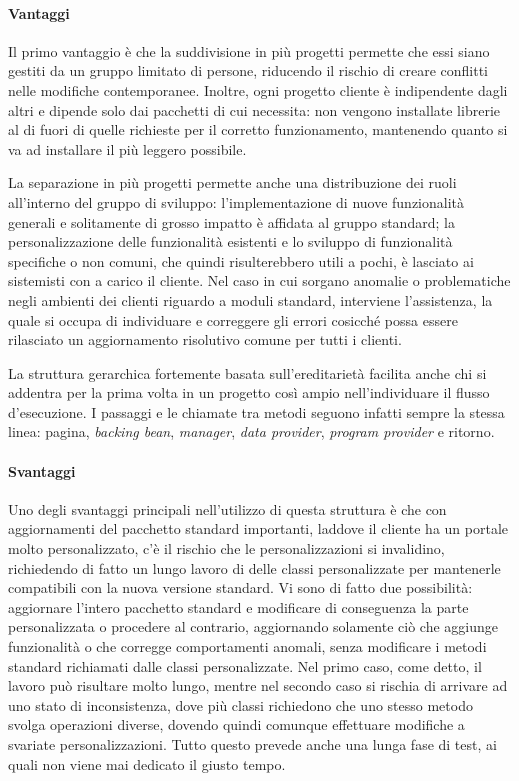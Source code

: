 \paragraph{Vantaggi}
Il primo vantaggio è che la suddivisione in più progetti permette che essi siano gestiti da un gruppo limitato di persone, riducendo il rischio di creare conflitti nelle modifiche contemporanee. Inoltre, ogni progetto cliente è indipendente dagli altri e dipende solo dai pacchetti di cui necessita: non vengono installate librerie al di fuori di quelle richieste per il corretto funzionamento, mantenendo quanto si va ad installare il più leggero possibile.

La separazione in più progetti permette anche una distribuzione dei ruoli all'interno del gruppo di sviluppo: l'implementazione di nuove funzionalità generali e solitamente di grosso impatto è affidata al gruppo standard; la personalizzazione delle funzionalità esistenti e lo sviluppo di funzionalità specifiche o non comuni, che quindi risulterebbero utili a pochi, è lasciato ai sistemisti con a carico il cliente. Nel caso in cui sorgano anomalie o problematiche negli ambienti dei clienti riguardo a moduli standard, interviene l'assistenza, la quale si occupa di individuare e correggere gli errori cosicché possa essere rilasciato un aggiornamento risolutivo comune per tutti i clienti.

La struttura gerarchica fortemente basata sull'ereditarietà facilita anche chi si addentra per la prima volta in un progetto così ampio nell'individuare il flusso d'esecuzione. I passaggi e le chiamate tra metodi seguono infatti sempre la stessa linea: pagina, \textit{backing bean}, \textit{manager}, \textit{data provider}, \textit{program provider} e ritorno.

\paragraph{Svantaggi}
Uno degli svantaggi principali nell'utilizzo di questa struttura è che con aggiornamenti del pacchetto standard importanti, laddove il cliente ha un portale molto personalizzato, c'è il rischio che le personalizzazioni si invalidino, richiedendo di fatto un lungo lavoro di  delle classi personalizzate per mantenerle compatibili con la nuova versione standard. Vi sono di fatto due possibilità: aggiornare l'intero pacchetto standard e modificare di conseguenza la parte personalizzata o procedere al contrario, aggiornando solamente ciò che aggiunge funzionalità o che corregge comportamenti anomali, senza modificare i metodi standard richiamati dalle classi personalizzate. Nel primo caso, come detto, il lavoro può risultare molto lungo, mentre nel secondo caso si rischia di arrivare ad uno stato di inconsistenza, dove più classi richiedono che uno stesso metodo svolga operazioni diverse, dovendo quindi comunque effettuare modifiche a svariate personalizzazioni. Tutto questo prevede anche una lunga fase di test, ai quali non viene mai dedicato il giusto tempo.

